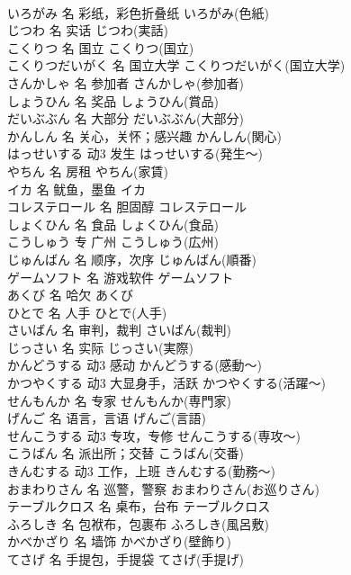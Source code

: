 \documentclass[8pt]{extreport}
\begin{document}
\begin{CJK}{UTF8}{min}
\\	いろがみ	名	彩纸，彩色折叠纸	いろがみ(色紙)	
\\	じつわ	名	实话	じつわ(実話)	
\\	こくりつ	名	国立	こくりつ(国立)	
\\	こくりつだいがく	名	国立大学	こくりつだいがく(国立大学)	
\\	さんかしゃ	名	参加者	さんかしゃ(参加者)	
\\	しょうひん	名	奖品	しょうひん(賞品)	
\\	だいぶぶん	名	大部分	だいぶぶん(大部分)	
\\	かんしん	名	关心，关怀；感兴趣	かんしん(関心)	
\\	はっせいする	动3	发生	はっせいする(発生～)	
\\	やちん	名	房租	やちん(家賃)	
\\	イカ	名	鱿鱼，墨鱼	イカ	
\\	コレステロール	名	胆固醇	コレステロール	
\\	しょくひん	名	食品	しょくひん(食品)	
\\	こうしゅう	专	广州	こうしゅう(広州)	
\\	じゅんばん	名	顺序，次序	じゅんばん(順番)	
\\	ゲームソフト	名	游戏软件	ゲームソフト	
\\	あくび	名	哈欠	あくび	
\\	ひとで	名	人手	ひとで(人手)	
\\	さいばん	名	审判，裁判	さいばん(裁判)	
\\	じっさい	名	实际	じっさい(実際)	
\\	かんどうする	动3	感动	かんどうする(感動～)	
\\	かつやくする	动3	大显身手，活跃	かつやくする(活躍～)	
\\	せんもんか	名	专家	せんもんか(専門家)	
\\	げんご	名	语言，言语	げんご(言語)	
\\	せんこうする	动3	专攻，专修	せんこうする(専攻～)	
\\	こうばん	名	派出所；交替	こうばん(交番)	
\\	きんむする	动3	工作，上班	きんむする(勤務～)	
\\	おまわりさん	名	巡警，警察	おまわりさん(お巡りさん)	
\\	テーブルクロス	名	桌布，台布	テーブルクロス	
\\	ふろしき	名	包袱布，包裹布	ふろしき(風呂敷)	
\\	かべかざり	名	墙饰	かべかざり(壁飾り)	
\\	てさげ	名	手提包，手提袋	てさげ(手提げ)	

\end{CJK}
\end{document}
